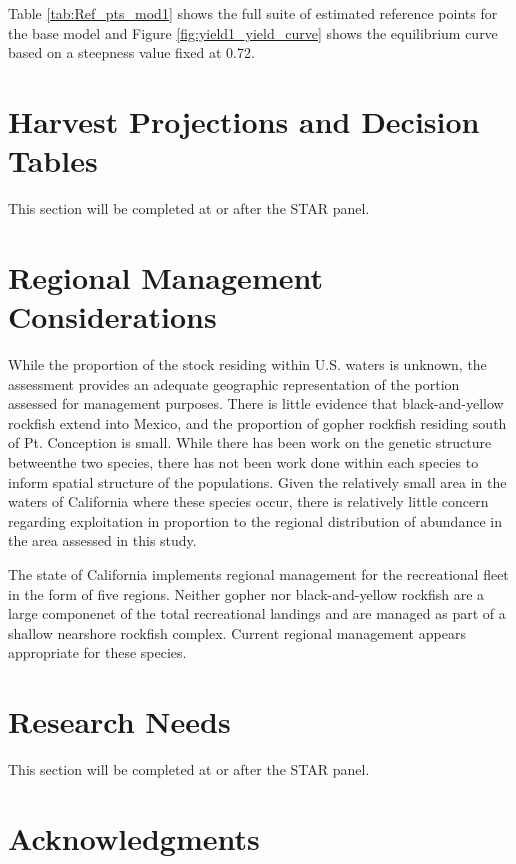 \documentclass[12pt,]{article}
\begin{document}
Table \ref{tab:Ref_pts_mod1} shows the full suite of estimated reference
points for the base model and Figure \ref{fig:yield1_yield_curve} shows
the equilibrium curve based on a steepness value fixed at 0.72.

\section{Harvest Projections and Decision
Tables}\label{harvest-projections-and-decision-tables}

This section will be completed at or after the STAR panel.

\section{Regional Management
Considerations}\label{regional-management-considerations}

While the proportion of the stock residing within U.S. waters is
unknown, the assessment provides an adequate geographic representation
of the portion assessed for management purposes. There is little
evidence that black-and-yellow rockfish extend into Mexico, and the
proportion of gopher rockfish residing south of Pt. Conception is small.
While there has been work on the genetic structure betweenthe two
species, there has not been work done within each species to inform
spatial structure of the populations. Given the relatively small area in
the waters of California where these species occur, there is relatively
little concern regarding exploitation in proportion to the regional
distribution of abundance in the area assessed in this study.

The state of California implements regional management for the
recreational fleet in the form of five regions. Neither gopher nor
black-and-yellow rockfish are a large componenet of the total
recreational landings and are managed as part of a shallow nearshore
rockfish complex. Current regional management appears appropriate for
these species.

\section{Research Needs}\label{research-needs}

This section will be completed at or after the STAR panel.

\section{Acknowledgments}\label{acknowledgments}
\end{document}
